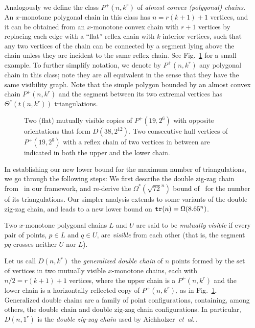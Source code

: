 \documentclass[11pt]{article}
\def\etal{{\it et~al.}\,}
\def\tr{{\tt tr}}
\begin{document}
Analogously we define the class $P^+(n,k^r)$ of {\em almost convex (polygonal) chains}.
An $x$-monotone polygonal chain in this class has $n=r(k+1)+1$
vertices, and it can be obtained from an $x$-monotone convex chain
with $r+1$ vertices by replacing each edge with a ``flat'' reflex
chain with $k$ interior vertices, such that any two vertices of the
chain can be connected by a segment lying above the chain unless they are incident
to the same reflex chain. See Fig.~\ref{f6} for a small example.
To further simplify notation,
we denote by $P^+(n,k^r)$ any polygonal chain in this class; note they are all equivalent
in the sense that they have the same visibility graph. Note that the simple polygon
bounded by an almost convex chain $P^+(n,k^r)$ and the segment between its two extremal
vertices has $\Theta^*(t(n,k^r))$ triangulations.
\begin{figure}[htbp]
\centerline{\epsfysize=1.4in }
\caption{Two (flat) mutually visible copies of $P^+(19,2^6)$
with opposite orientations that form $D(38,2^{12})$. Two consecutive
hull vertices of $P^+(19,2^6)$ with a reflex chain of two vertices in
between are indicated in both the upper and the lower chain.}
\label{f6}
\end{figure}


In establishing our new lower bound for the maximum number of triangulations,
we go through the following steps: We first describe the double zig-zag chain
from~\cite{AHV+06} in our framework, and re-derive the $\Omega^*(\sqrt{72}^n)$
bound of~\cite{AHV+06} for the number of its triangulations. Our simpler analysis
extends to some variants of the double zig-zag chain, and leads to a new
lower bound on $\tr(n)=\Omega(8.65^n)$.

Two $x$-monotone polygonal chains $L$ and $U$ are said to be {\em mutually
visible} if every pair of points, $p \in L$ and $q \in U$, are {\em visible}
from each other (that is, the segment $pq$ crosses neither $U$ nor $L$).

Let us call $D(n,k^r)$ the {\em generalized double chain} of $n$ points formed by
the set of vertices in two mutually visible $x$-monotone chains, each
with $n/2=r(k+1)+1$ vertices, where the upper chain is a $P^+(n,k^r)$ and
the lower chain is a horizontally reflected copy of $P^+(n,k^r)$,
as in Fig.~\ref{f6}. Generalized double chains are a family of point configurations,
containing, among others, the double chain and double zig-zag chain configurations.
In particular, $D(n,1^r)$ is the \emph{double zig-zag chain} used
by Aichholzer~\etal\cite{AHV+06}.
\end{document}
